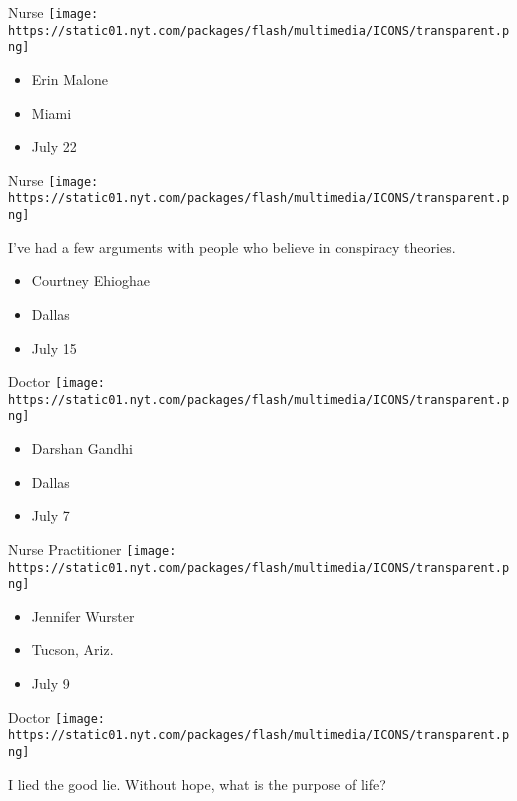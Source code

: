 \protect\hyperlink{item-erin-malone}{}

Nurse
\texttt{[image: https://static01.nyt.com/packages/flash/multimedia/ICONS/transparent.png]}

\begin{itemize}
\tightlist
\item
  Erin Malone
\item
  Miami
\item
  July 22
\end{itemize}

\protect\hyperlink{item-courtney-ehioghae}{}

Nurse
\texttt{[image: https://static01.nyt.com/packages/flash/multimedia/ICONS/transparent.png]}

I've had a few arguments with people who believe in conspiracy theories.

\begin{itemize}
\tightlist
\item
  Courtney Ehioghae
\item
  Dallas
\item
  July 15
\end{itemize}

\protect\hyperlink{item-darshan-gandhi}{}

Doctor
\texttt{[image: https://static01.nyt.com/packages/flash/multimedia/ICONS/transparent.png]}

\begin{itemize}
\tightlist
\item
  Darshan Gandhi
\item
  Dallas
\item
  July 7
\end{itemize}

\protect\hyperlink{item-jennifer-wurster}{}

Nurse Practitioner
\texttt{[image: https://static01.nyt.com/packages/flash/multimedia/ICONS/transparent.png]}

\begin{itemize}
\tightlist
\item
  Jennifer Wurster
\item
  Tucson, Ariz.
\item
  July 9
\end{itemize}

\protect\hyperlink{item-anna-fong}{}

Doctor
\texttt{[image: https://static01.nyt.com/packages/flash/multimedia/ICONS/transparent.png]}

I lied the good lie. Without hope, what is the purpose of life?

